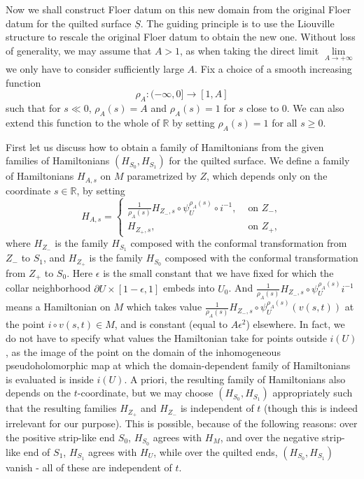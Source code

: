\documentclass{amsart}
\numberwithin{equation}{section}
\numberwithin{figure}{section}
\begin{document}
	Now we shall construct Floer datum on this new domain from the original Floer datum for the quilted surface $\underline{S}$. The guiding principle is to use the Liouville structure to rescale the original Floer datum to obtain the new one. 
Without loss of generality, we may assume that $A > 1$, as when taking the direct limit $\lim\limits_{A \to +\infty}$ we only have to consider sufficiently large $A$.
Fix a choice of a smooth increasing function
\begin{equation*}
\rho_{A}: (-\infty, 0] \to [1, A]
\end{equation*}
such that for $s \ll 0$, $\rho_{A}(s) = A$ and $\rho_{A}(s) = 1$ for $s$ close to $0$. We can also extend this function to the whole of $\mathbb{R}$ by setting $\rho_{A}(s) = 1$ for all $s \ge 0$. \par
	First let us discuss how to obtain a family of Hamiltonians from the given families of Hamiltonians $(H_{S_{0}}, H_{S_{1}})$ for the quilted surface. We define a family of Hamiltonians $H_{A, s}$ on $M$ parametrized by $Z$, which depends only on the coordinate $s \in \mathbb{R}$, by setting
\begin{equation}\label{family of Hamiltonians from those on the quilted surface}
H_{A, s} =
\begin{cases}
\frac{1}{\rho_{A}(s)} H_{Z_{-}, s} \circ \psi_{U}^{\rho_{A}(s)} \circ i^{-1}, &\text{ on } Z_{-}, \\
H_{Z_{+}, s}, &\text{ on } Z_{+},
\end{cases}
\end{equation}
where $H_{Z_{-}}$ is the family $H_{S_{1}}$ composed with the conformal transformation from $Z_{-}$ to $S_{1}$, and $H_{Z_{+}}$ is the family $H_{S_{0}}$ composed with the conformal transformation from $Z_{+}$ to $S_{0}$.
Here $\epsilon$ is the small constant that we have fixed for which the collar neighborhood $\partial U \times [1-\epsilon, 1]$ embeds into $U_{0}$. And $\frac{1}{\rho_{A}(s)} H_{Z_{-},s} \circ \psi_{U}^{\rho_{A}(s)} i^{-1}$ means a Hamiltonian on $M$ which takes value $\frac{1}{\rho_{A}(s)} H_{Z_{-}, s} \circ \psi_{U}^{\rho_{A}(s)}(v(s, t))$ at the point $i \circ v(s, t) \in M$, and is constant (equal to $A\epsilon^{2}$) elsewhere. In fact, we do not have to specify what values the Hamiltonian take for points outside $i(U)$, as the image of the point on the domain of the inhomogeneous pseudoholomorphic map at which the domain-dependent family of Hamiltonians is evaluated is inside $i(U)$.
A priori, the resulting family of Hamiltonians also depends on the $t$-coordinate, but we may choose $(H_{S_{0}}, H_{S_{1}})$ appropriately such that the resulting families $H_{Z_{+}}$ and $H_{Z_{-}}$ is independent of $t$ (though this is indeed irrelevant for our purpose). This is possible, because of the following reasons: over the positive strip-like end $S_{0}$, $H_{S_{0}}$ agrees with $H_{M}$, and over the negative strip-like end of $S_{1}$, $H_{S_{1}}$ agrees with $H_{U}$, while over the quilted ends, $(H_{S_{0}}, H_{S_{1}})$ vanish - all of these are independent of $t$. \par
\end{document}
